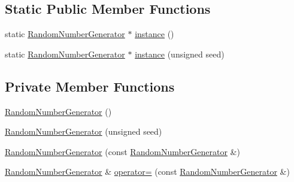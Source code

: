 \subsection*{Static Public Member Functions}
\begin{DoxyCompactItemize}
\item 
static \hyperlink{class_random_number_generator}{Random\+Number\+Generator} $\ast$ \hyperlink{class_random_number_generator_ab20e4f6dae4e1d216357d26675488e45}{instance} ()
\item 
static \hyperlink{class_random_number_generator}{Random\+Number\+Generator} $\ast$ \hyperlink{class_random_number_generator_acb83c75147d9d2bff7b3e3f45239ecb1}{instance} (unsigned seed)
\end{DoxyCompactItemize}
\subsection*{Private Member Functions}
\begin{DoxyCompactItemize}
\item 
\hyperlink{class_random_number_generator_a8e7e711ea58f13f3ed95becbe33684e9}{Random\+Number\+Generator} ()
\item 
\hyperlink{class_random_number_generator_acef4ebf02f3377b707787aa1f69aff1d}{Random\+Number\+Generator} (unsigned seed)
\item 
\hyperlink{class_random_number_generator_a0007ec836f6bb43c27e2082264189c4c}{Random\+Number\+Generator} (const \hyperlink{class_random_number_generator}{Random\+Number\+Generator} \&)
\item 
\hyperlink{class_random_number_generator}{Random\+Number\+Generator} \& \hyperlink{class_random_number_generator_a5986c38214e8c774239eee89c768f172}{operator=} (const \hyperlink{class_random_number_generator}{Random\+Number\+Generator} \&)
\end{DoxyCompactItemize}
